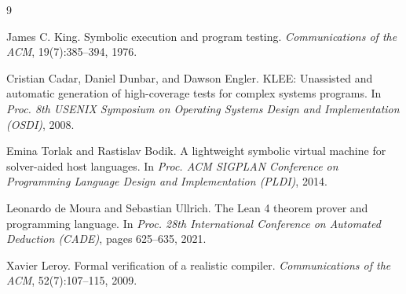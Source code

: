 \documentclass[10pt,twocolumn]{article}
\begin{document}
\clearpage
\begin{thebibliography}{9}

James C. King.
Symbolic execution and program testing.
\emph{Communications of the ACM}, 19(7):385--394, 1976.

Cristian Cadar, Daniel Dunbar, and Dawson Engler.
KLEE: Unassisted and automatic generation of high-coverage tests for complex
systems programs.
In \emph{Proc. 8th USENIX Symposium on Operating Systems Design and
Implementation (OSDI)}, 2008.

Emina Torlak and Rastislav Bodik.
A lightweight symbolic virtual machine for solver-aided host languages.
In \emph{Proc. ACM SIGPLAN Conference on Programming Language Design and
Implementation (PLDI)}, 2014.

Leonardo de Moura and Sebastian Ullrich.
The Lean 4 theorem prover and programming language.
In \emph{Proc. 28th International Conference on Automated Deduction (CADE)},
pages 625--635, 2021.

Xavier Leroy.
Formal verification of a realistic compiler.
\emph{Communications of the ACM}, 52(7):107--115, 2009.

\end{thebibliography}
\end{document}
